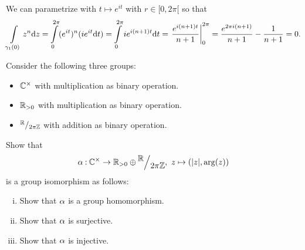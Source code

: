 \documentclass[12pt]{memoir}
\begin{document}
\begin{ptcbr}
    We can parametrize with $t\mapsto e^{it}$ with $r\in[0,2\pi[$ so that 
    $$\int\limits_{\ga_1(0)}z^n\dd z=\int\limits_0^{2\pi}(e^{it})^n(ie^{it}\dd t)=\int\limits_0^{2\pi}ie^{i(n+1)t}\dd t=\eval{\frac{e^{i(n+1)t}}{n+1}}_{0}^{2\pi}=\frac{e^{2\pi i(n+1)}}{n+1}-\frac{1}{n+1}=0.$$
\end{ptcbr}

\begin{Ej}
    Consider the following three groups:
    \begin{itemize}
        \itemsep=-0.4em
        \item $\mathbb{C}^\times$ with multiplication as binary operation.
        \item $\mathbb{R}_{>0}$ with multiplication as binary operation.
        \item $\quot{\bR}{2\pi\bZ}$ with addition as binary operation.
    \end{itemize}
    Show that 
    $$\al\: \bC^\x\to \bR_{>0}\oplus\quot{\bR}{2\pi\bZ},\ z\mapsto(|z|,\arg(z))$$
    is a group isomorphism as follows:
    \begin{enumerate}[i)]
        \itemsep=-0.4em
        \item Show that $\alpha$ is a group homomorphism. 
        \item Show that $\alpha$ is surjective. 
        \item Show that $\alpha$ is injective. 
    \end{enumerate}
\end{Ej}
\end{document}
